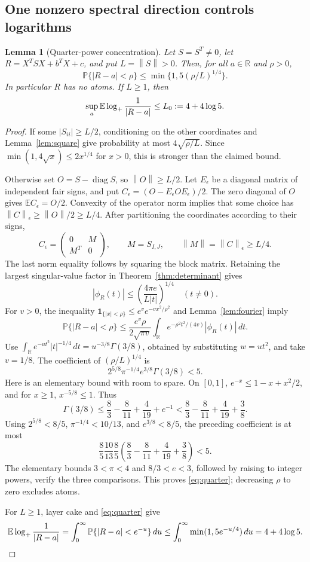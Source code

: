 \documentclass[11pt]{article}
\numberwithin{equation}{section}
\newtheorem{lemma}[theorem]{Lemma}
\theoremstyle{definition}\newtheorem{definition}[theorem]{Definition}
\theoremstyle{remark}\newtheorem{remark}[theorem]{Remark}
\newcommand{\R}{\mathbb R}\newcommand{\E}{\mathbb E}\newcommand{\PP}{\mathbb P}
\newcommand{\1}{\mathbf 1}\newcommand{\diag}{\operatorname{diag}}
\newcommand{\norm}[1]{\left\lVert#1\right\rVert}\newcommand{\abs}[1]{\left|#1\right|}
\begin{document}
\subsection{One nonzero spectral direction controls logarithms}
\begin{lemma}[Quarter-power concentration]\label{lem:quarter}
Let $S=S^T\ne0$, let $R=X^TSX+b^TX+c$, and put $L=\norm S>0$. Then, for all $a\in\R$ and $\rho>0$,
\begin{equation}\label{eq:quarter}
 \PP\{|R-a|<\rho\}\le\min\{1,5(\rho/L)^{1/4}\}.
\end{equation}
In particular $R$ has no atoms. If $L\ge1$, then
\begin{equation}\label{eq:log-bound}
 \sup_a\E\logp\frac1{|R-a|}\le L_0:=4+4\log5.
\end{equation}
\end{lemma}
\begin{proof}
If some $|S_{ii}|\ge L/2$, conditioning on the other coordinates and Lemma~\ref{lem:square} give probability at most $4\sqrt{\rho/L}$. Since $\min(1,4\sqrt x)\le2x^{1/4}$ for $x>0$, this is stronger than the claimed bound.

Otherwise set $O=S-\diag S$, so $\norm O\ge L/2$. Let $E_\epsilon$ be a diagonal matrix of independent fair signs, and put $C_\epsilon=(O-E_\epsilon O E_\epsilon)/2$. The zero diagonal of $O$ gives $\E C_\epsilon=O/2$. Convexity of the operator norm implies that some choice has $\norm C_\epsilon\ge\norm O/2\ge L/4$. After partitioning the coordinates according to their signs,
\[
 C_\epsilon=\begin{pmatrix}0&M\\M^T&0\end{pmatrix},\qquad
 M=S_{I,J},\qquad \norm M=\norm C_\epsilon\ge L/4.
\]
The last norm equality follows by squaring the block matrix. Retaining the largest singular-value factor in Theorem~\ref{thm:determinant} gives
\[
 |\phi_R(t)|\le\left(\frac{4\pi e}{L|t|}\right)^{1/4}\quad(t\ne0).
\]
For $v>0$, the inequality $\1_{\{|x|<\rho\}}\le e^v e^{-vx^2/\rho^2}$ and Lemma~\ref{lem:fourier} imply
\[
 \PP\{|R-a|<\rho\}\le\frac{e^v\rho}{2\sqrt{\pi v}}
 \int_\R e^{-\rho^2t^2/(4v)}|\phi_R(t)|\,dt.
\]
Use $\int_\R e^{-ut^2}|t|^{-1/4}\,dt=u^{-3/8}\Gamma(3/8)$, obtained by substituting $w=ut^2$, and take $v=1/8$. The coefficient of $(\rho/L)^{1/4}$ is
\[
 2^{5/8}\pi^{-1/4}e^{3/8}\Gamma(3/8)<5.
\]
Here is an elementary bound with room to spare. On $[0,1]$, $e^{-x}\le1-x+x^2/2$, and for $x\ge1$, $x^{-5/8}\le1$. Thus
\[
 \Gamma(3/8)\le\frac83-\frac8{11}+\frac4{19}+e^{-1}
 <\frac83-\frac8{11}+\frac4{19}+\frac38.
\]
Using $2^{5/8}<8/5$, $\pi^{-1/4}<10/13$, and $e^{3/8}<8/5$, the preceding coefficient is at most
\[
 \frac85\frac{10}{13}\frac85
 \left(\frac83-\frac8{11}+\frac4{19}+\frac38\right)<5.
\]
The elementary bounds $3<\pi<4$ and $8/3<e<3$, followed by raising to integer powers, verify the three comparisons. This proves \eqref{eq:quarter}; decreasing $\rho$ to zero excludes atoms.

For $L\ge1$, layer cake and \eqref{eq:quarter} give
\[
 \E\logp\frac1{|R-a|}
 =\int_0^\infty\PP\{|R-a|<e^{-u}\}\,du
 \le\int_0^\infty\min(1,5e^{-u/4})\,du
 =4+4\log5.
\]
\end{proof}
\end{document}
